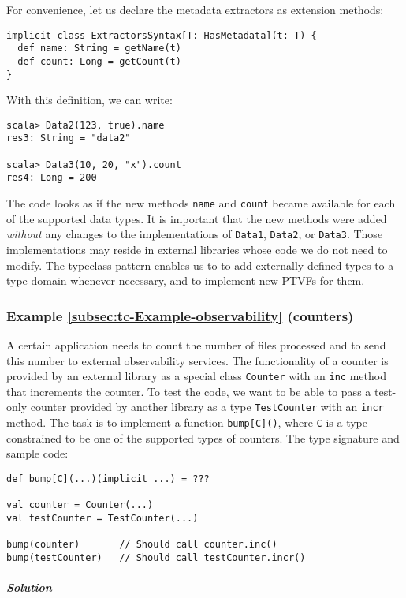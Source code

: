 For convenience, let us declare the metadata extractors as extension
methods:
\begin{lstlisting}
implicit class ExtractorsSyntax[T: HasMetadata](t: T) {
  def name: String = getName(t)
  def count: Long = getCount(t)
}
\end{lstlisting}
With this definition, we can write:
\begin{lstlisting}
scala> Data2(123, true).name
res3: String = "data2"

scala> Data3(10, 20, "x").count
res4: Long = 200
\end{lstlisting}
The code looks as if the new methods \lstinline!name! and \lstinline!count!
became available for each of the supported data types. It is important
that the new methods were added \emph{without} any changes to the
implementations of \lstinline!Data1!, \lstinline!Data2!, or \lstinline!Data3!.
Those implementations may reside in external libraries whose code
we do not need to modify. The typeclass pattern enables us to to add
externally defined types to a type domain whenever necessary, and
to implement new PTVFs for them.

\subsubsection{Example \label{subsec:tc-Example-observability}\ref{subsec:tc-Example-observability}
(counters)}

A certain application needs to count the number of files processed
and to send this number to external observability services. The functionality
of a counter is provided by an external library as a special class
\lstinline!Counter! with an \lstinline!inc! method that increments
the counter. To test the code, we want to be able to pass a test-only
counter provided by another library as a type \lstinline!TestCounter!
with an \lstinline!incr! method. The task is to implement a function
\lstinline!bump[C]()!, where \lstinline!C! is a type constrained
to be one of the supported types of counters. The type signature and
sample code:
\begin{lstlisting}
def bump[C](...)(implicit ...) = ???

val counter = Counter(...)
val testCounter = TestCounter(...)

bump(counter)       // Should call counter.inc()
bump(testCounter)   // Should call testCounter.incr()
\end{lstlisting}


\subparagraph{Solution}

